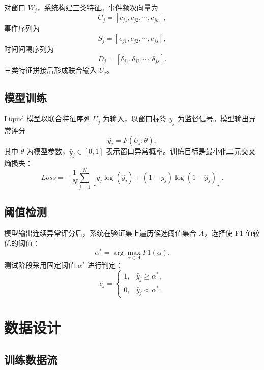 对窗口 $W_j$，系统构建三类特征。事件频次向量为
\begin{equation}
    C_j=[c_{j1},c_{j2},\cdots,c_{jk}],
\end{equation}
事件序列为
\begin{equation}
    S_j=[e_{j1},e_{j2},\cdots,e_{js}],
\end{equation}
时间间隔序列为
\begin{equation}
    D_j=[\delta_{j1},\delta_{j2},\cdots,\delta_{js}].
\end{equation}
三类特征拼接后形成联合输入 $U_j$。

\subsection{模型训练}

Liquid 模型以联合特征序列 $U_j$ 为输入，以窗口标签 $y_j$ 为监督信号。模型输出异常评分
\begin{equation}
    \hat{y}_j=F(U_j;\theta),
\end{equation}
其中 $\theta$ 为模型参数，$\hat{y}_j\in[0,1]$ 表示窗口异常概率。训练目标是最小化二元交叉熵损失：
\begin{equation}
    Loss=-\frac{1}{N}\sum_{j=1}^{N}\left[y_j\log(\hat{y}_j)+(1-y_j)\log(1-\hat{y}_j)\right].
\end{equation}

\subsection{阈值检测}

模型输出连续异常评分后，系统在验证集上遍历候选阈值集合 $A$，选择使 F1 值较优的阈值：
\begin{equation}
    \alpha^*=\arg\max_{\alpha\in A}F1(\alpha).
\end{equation}
测试阶段采用固定阈值 $\alpha^*$ 进行判定：
\begin{equation}
    \hat{c}_j=
    \begin{cases}
        1, & \hat{y}_j \geq \alpha^*,\\
        0, & \hat{y}_j < \alpha^*.
    \end{cases}
\end{equation}

\section{数据设计}

\subsection{训练数据流}

